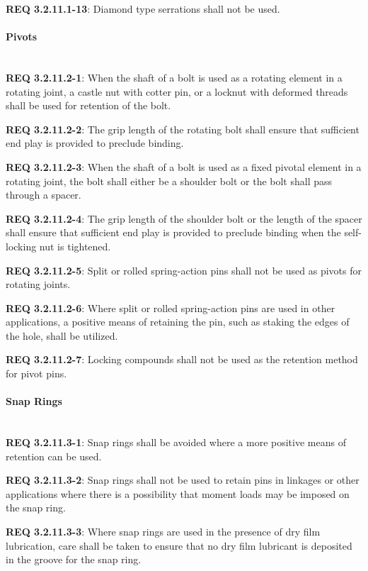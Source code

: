 \documentclass[12pt]{article}
\begin{document}
\noindent \textbf{REQ 3.2.11.1-13}: Diamond type serrations shall not be used.


\paragraph{Pivots} \mbox{} \\ %
\noindent \textbf{REQ 3.2.11.2-1}: When the shaft of a bolt is used as a rotating element in a rotating joint, a castle nut with cotter pin, or a locknut with deformed threads shall be used for retention of the bolt. 

\noindent \textbf{REQ 3.2.11.2-2}: The grip length of the rotating bolt shall ensure that sufficient end play is provided to preclude binding. 

\noindent \textbf{REQ 3.2.11.2-3}: When the shaft of a bolt is used as a fixed pivotal element in a rotating joint, the bolt shall either be a shoulder bolt or the bolt shall pass through a spacer. 

\noindent \textbf{REQ 3.2.11.2-4}: The grip length of the shoulder bolt or the length of the spacer shall ensure that sufficient end play is provided to preclude binding when the self-locking nut is tightened. 

\noindent \textbf{REQ 3.2.11.2-5}: Split or rolled spring-action pins shall not be used as pivots for rotating joints. 

\noindent \textbf{REQ 3.2.11.2-6}: Where split or rolled spring-action pins are used in other applications, a positive means of retaining the pin, such as staking the edges of the hole, shall be utilized. 

\noindent \textbf{REQ 3.2.11.2-7}: Locking compounds shall not be used as the retention method for pivot pins.


\paragraph{Snap Rings} \mbox{} \\ %
\noindent \textbf{REQ 3.2.11.3-1}: Snap rings shall be avoided where a more positive means of retention can be used. 

\noindent \textbf{REQ 3.2.11.3-2}: Snap rings shall not be used to retain pins in linkages or other applications where there is a possibility that moment loads may be imposed on the snap ring. 

\noindent \textbf{REQ 3.2.11.3-3}: Where snap rings are used in the presence of dry film lubrication, care shall be taken to ensure that no dry film lubricant is deposited in the groove for the snap ring. 
\end{document}
